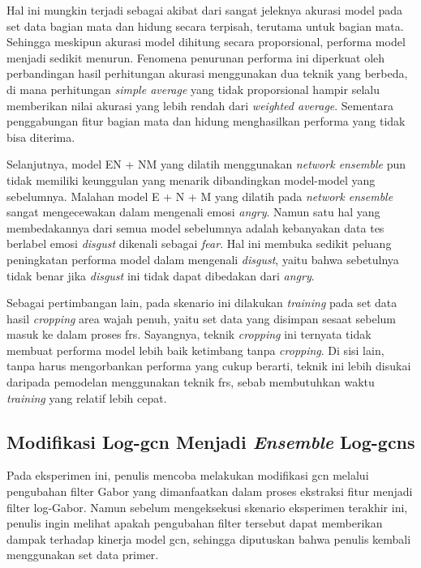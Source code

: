 Hal ini mungkin terjadi sebagai akibat dari sangat jeleknya akurasi model pada set data bagian mata dan hidung secara terpisah, terutama untuk bagian mata. Sehingga meskipun akurasi model dihitung secara proporsional, performa model menjadi sedikit menurun. Fenomena penurunan performa ini diperkuat oleh perbandingan hasil perhitungan akurasi menggunakan dua teknik yang berbeda, di mana perhitungan \textit{simple average} yang tidak proporsional hampir selalu memberikan nilai akurasi yang lebih rendah dari \textit{weighted average}. Sementara penggabungan fitur bagian mata dan hidung menghasilkan performa yang tidak bisa diterima.

Selanjutnya, model EN + NM yang dilatih menggunakan \textit{network ensemble} pun tidak memiliki keunggulan yang menarik dibandingkan model-model yang sebelumnya. Malahan model E + N + M yang dilatih pada \textit{network ensemble} sangat mengecewakan dalam mengenali emosi \textit{angry}. Namun satu hal yang membedakannya dari semua model sebelumnya adalah kebanyakan data tes berlabel emosi \textit{disgust} dikenali sebagai \textit{fear}. Hal ini membuka sedikit peluang peningkatan performa model dalam mengenali \textit{disgust}, yaitu bahwa sebetulnya tidak benar jika \textit{disgust} ini tidak dapat dibedakan dari \textit{angry}.

Sebagai pertimbangan lain, pada skenario ini dilakukan \textit{training} pada set data hasil \textit{cropping} area wajah penuh, yaitu set data yang disimpan sesaat sebelum masuk ke dalam proses \acrshort{frs}. Sayangnya, teknik \textit{cropping} ini ternyata tidak membuat performa model lebih baik ketimbang tanpa \textit{cropping}. Di sisi lain, tanpa harus mengorbankan performa yang cukup berarti, teknik ini lebih disukai daripada pemodelan menggunakan teknik \acrshort{frs}, sebab membutuhkan waktu \textit{training} yang relatif lebih cepat.

\subsection{Modifikasi Log-\acrshort{gcn} Menjadi \textit{Ensemble} Log-\acrshort{gcns}}
Pada eksperimen ini, penulis mencoba melakukan modifikasi \acrshort{gcn} melalui pengubahan filter Gabor yang dimanfaatkan dalam proses ekstraksi fitur menjadi filter log-Gabor. Namun sebelum mengeksekusi skenario eksperimen terakhir ini, penulis ingin melihat apakah pengubahan filter tersebut dapat memberikan dampak terhadap kinerja model \acrshort{gcn}, sehingga diputuskan bahwa penulis kembali menggunakan set data primer.

